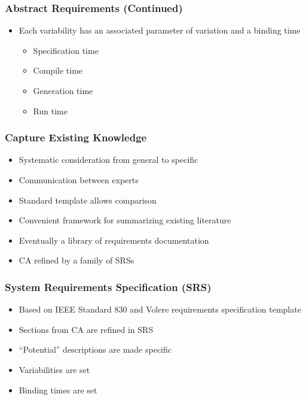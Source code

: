 \documentclass[t,12pt,numbers,fleqn]{beamer}
\newcounter{temp}
\begin{document}

\begin{frame}

\frametitle{Abstract Requirements (Continued)}

\begin{itemize}
\item Each variability has an associated parameter of variation and a binding time
\begin{itemize}
\item Specification time
\item Compile time
\item Generation time
\item Run time
\end{itemize}
\end{itemize}
\end{frame}


\begin{frame}

\frametitle{Capture Existing Knowledge}

\begin{itemize}
\item Systematic consideration from general to specific
\item Communication between experts
\item Standard template allows comparison
\item Convenient framework for summarizing existing literature
\item Eventually a library of requirements documentation
\item CA refined by a family of SRSs
\end{itemize}
\end{frame}

\begin{frame}

\frametitle{System Requirements Specification (SRS)}

\begin{itemize}

\item Based on IEEE Standard 830 and Volere requirements specification template
\item Sections from CA are refined in SRS
\item ``Potential'' descriptions are made specific
\item Variabilities are set
\item Binding times are set

\end{itemize}

\end{frame}
\end{document}
